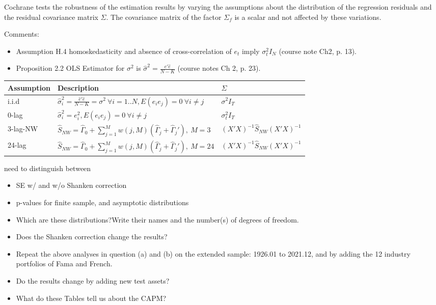 \documentclass[]{article}
\begin{document}
\begin{itemize}
	Cochrane tests the robustness of the estimation results by varying the assumptions about the distribution of the regression residuals and the residual covariance matrix $\Sigma$. The covariance matrix of the factor $\Sigma_f$ is a scalar and not affected by these variations.
	
	Comments:
	\begin{itemize}
		\item Assumption H.4 homoskedasticity and absence of cross-correlation of $e_t$ imply $\sigma_t^2I_N$ (course note Ch2, p. 13).
		\item Proposition 2.2 OLS Estimator for $\sigma^2$ is $\hat \sigma^2=\frac{\hat e' \hat e}{N-K}$ (course notes Ch 2, p. 23).
	\end{itemize}
	
	\begin{tabular}{|l|l|l|}
		\hline
		Assumption & Description& $\Sigma$\\
		\hline
		i.i.d &$\hat \sigma^2_i = \frac{\hat e' \hat e}{N-K} = \sigma^2 \ \forall i=1..N, E(e_ie_j)=0\  \forall i \ne j$ & $\sigma^2I_T$ \\
		0-lag & $\hat \sigma^2_i = e_i^2, E(e_ie_j)=0 \ \forall i \ne j$  & $\sigma_t^2I_T$\\
		3-lag-NW& $\hat S_{NW} = \hat \Gamma_0+\sum_{j=1}^{M}w(j,M)\left(\hat \Gamma_j+\hat \Gamma_j'\right), \ M=3$  & $(X'X)^{-1} \hat S_{NW}(X'X)^{-1}$\\
		24-lag& $\hat S_{NW} = \hat \Gamma_0+\sum_{j=1}^{M}w(j,M)\left(\hat \Gamma_j+\hat \Gamma_j'\right), \ M=24$  & $(X'X)^{-1} \hat S_{NW}(X'X)^{-1}$\\
		\hline
	\end{tabular}
	
	need to distinguish between
	\begin{itemize}
		\item SE w/ and w/o Shanken correction\\
		\item p-values for finite sample, and asymptotic distributions\\
		\item Which  are  these  distributions?Write  their names and the number(s) of degrees of freedom.
		\item Does  the  Shanken  correction  change  the  results?
		\item Repeat the above analyses in question (a) and (b) on the extended sample: 1926.01 to 2021.12, and by adding the 12 industry portfolios of Fama and French.
		\item Do the results change by adding new test assets?
		\item What do these Tables tell us about the CAPM?
		

\end{itemize}
\end{itemize}
\end{document}

